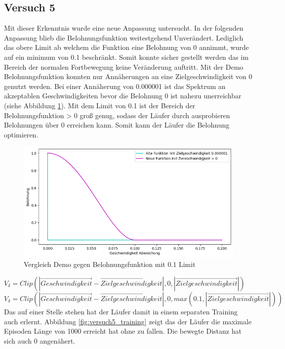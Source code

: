 \subsection{Versuch 5}
Mit dieser Erkenntnis wurde eine neue Anpassung untersucht. In der folgenden Anpassung blieb die Belohnungsfunktion weitestgehend Unverändert. Lediglich das obere Limit ab welchem die Funktion eine Belohnung von 0 annimmt, wurde auf ein minimum von 0.1 beschränkt. Somit konnte sicher gestellt werden das im Bereich der normalen Fortbewegung keine Veränderung auftritt. Mit der Demo Belohnungsfunktion konnten nur Annäherungen an eine Zielgeschwindigkeit von 0 genutzt werden. Bei einer Annäherung von 0.000001 ist das Spektrum an akzeptablen Geschwindigkeiten bevor die Belohnung 0 ist nahezu unerreichbar (siehe Abbildung \ref{fig:match_velocity_vergleich_clip}). Mit dem Limit von 0.1 ist der Bereich der Belohnungsfunktion > 0 groß genug, sodass der Läufer durch ausprobieren Belohnungen über 0 erreichen kann. Somit kann der Läufer die Belohnung optimieren.\\

\begin{figure}[H]
  \centering  
  \includegraphics[scale=0.5]{img/match_velocity_vergleich_clip.png}
  \caption{Vergleich Demo gegen Belohnungsfunktion mit 0.1 Limit}
  \label{fig:match_velocity_vergleich_clip}
\end{figure}
$V_\delta=Clip(|\vec{Geschwindigkeit} - \vec{Zielgeschwindigkeit}|, 0, |\vec{Zielgeschwindigkeit}|)$ \\
$V_\delta=Clip(|\vec{Geschwindigkeit} - \vec{Zielgeschwindigkeit}|, 0, max(0.1, |\vec{Zielgeschwindigkeit}|))$ \\

Das auf einer Stelle stehen hat der Läufer damit in einem separaten Training auch erlernt. Abbildung \ref{fig:versuch5_training} zeigt das der Läufer die maximale Episoden Länge von 1000 erreicht hat ohne zu fallen. Die bewegte Distanz hat sich auch 0 angenähert.

